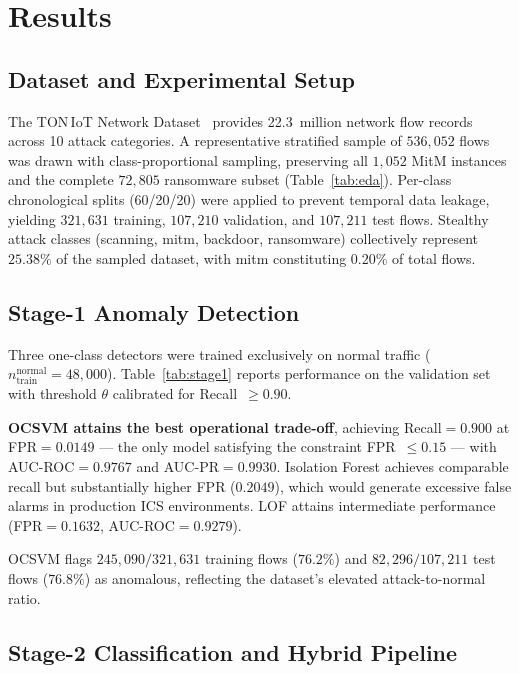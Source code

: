 \section{Results}
\label{sec:results}

\subsection{Dataset and Experimental Setup}

The TON\,IoT Network Dataset~\cite{ref_ton_iot} provides 22.3~million network flow
records across 10 attack categories. A representative stratified sample of $536{,}052$
flows was drawn with class-proportional sampling, preserving all $1{,}052$ MitM instances
and the complete $72{,}805$ ransomware subset (Table~\ref{tab:eda}).
Per-class chronological splits (60/20/20) were applied to prevent temporal data leakage,
yielding $321{,}631$ training, $107{,}210$ validation, and $107{,}211$ test flows.
Stealthy attack classes (scanning, mitm, backdoor, ransomware) collectively
represent $25.38\%$ of the sampled dataset, with mitm constituting
$0.20\%$ of total flows.

\subsection{Stage-1 Anomaly Detection}
\label{sec:results_s1}

Three one-class detectors were trained exclusively on normal traffic
($n_\text{train}^\text{normal}=48{,}000$). Table~\ref{tab:stage1} reports performance
on the validation set with threshold $\theta$ calibrated for Recall~$\geq 0.90$.

\textbf{OCSVM attains the best operational trade-off}, achieving Recall$=0.900$ at
FPR$=0.0149$ --- the only model satisfying the constraint FPR~$\leq 0.15$ --- with
AUC-ROC$=0.9767$ and AUC-PR$=0.9930$.
Isolation Forest achieves comparable recall but substantially higher FPR ($0.2049$),
which would generate excessive false alarms in production ICS environments.
LOF attains intermediate performance (FPR$=0.1632$, AUC-ROC$=0.9279$).

OCSVM flags $245{,}090/321{,}631$ training flows ($76.2\%$) and $82{,}296/107{,}211$
test flows ($76.8\%$) as anomalous, reflecting the dataset's elevated attack-to-normal
ratio.

\subsection{Stage-2 Classification and Hybrid Pipeline}
\label{sec:results_s2}

